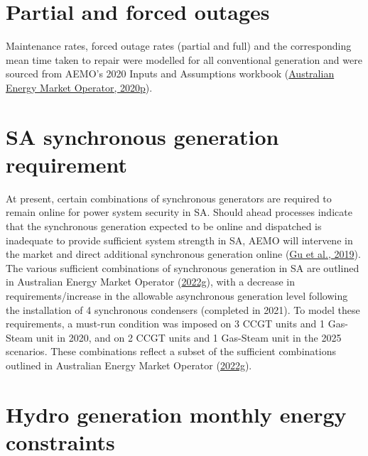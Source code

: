 \documentclass[12pt,a4paper,]{report}
\begin{document}
\hypertarget{partial-and-forced-outages}{%
\section{Partial and forced outages}\label{partial-and-forced-outages}}

Maintenance rates, forced outage rates (partial and full) and the
corresponding mean time taken to repair were modelled for all
conventional generation and were sourced from AEMO's 2020 Inputs and
Assumptions workbook
(\protect\hyperlink{ref-australianenergymarketoperator2020InputsAssumptions2020}{Australian
Energy Market Operator, 2020p}).

\hypertarget{sa-synchronous-generation-requirement}{%
\section{SA synchronous generation
requirement}\label{sa-synchronous-generation-requirement}}

At present, certain combinations of synchronous generators are required
to remain online for power system security in SA. Should ahead processes
indicate that the synchronous generation expected to be online and
dispatched is inadequate to provide sufficient system strength in SA,
AEMO will intervene in the market and direct additional synchronous
generation online (\protect\hyperlink{ref-guReviewSystemStrength2019}{Gu
et al., 2019}). The various sufficient combinations of synchronous
generation in SA are outlined in Australian Energy Market Operator
(\protect\hyperlink{ref-australianenergymarketoperatorTransferLimitAdvice2022}{2022g}),
with a decrease in requirements/increase in the allowable asynchronous
generation level following the installation of 4 synchronous condensers
(completed in 2021). To model these requirements, a must-run condition
was imposed on 3 CCGT units and 1 Gas-Steam unit in 2020, and on 2 CCGT
units and 1 Gas-Steam unit in the 2025 scenarios. These combinations
reflect a subset of the sufficient combinations outlined in Australian
Energy Market Operator
(\protect\hyperlink{ref-australianenergymarketoperatorTransferLimitAdvice2022}{2022g}).

\hypertarget{hydro-generation-monthly-energy-constraints}{%
\section{Hydro generation monthly energy
constraints}\label{hydro-generation-monthly-energy-constraints}}
\end{document}
